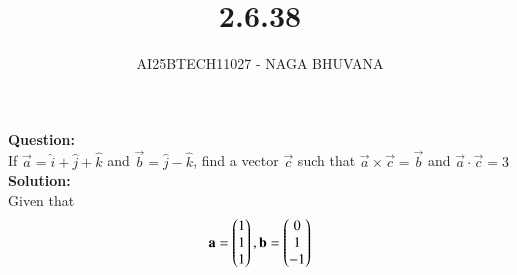 \documentclass[journal,12pt,onecolumn]{IEEEtran}
\begin{document}
\title{2.6.38}
\author{AI25BTECH11027 - NAGA BHUVANA}
{\let\newpage\relax\maketitle}
\noindent
		\textbf{Question:}\\
If $\vec{a}=\hat{i}+\hat{j}+\hat{k}$ and $\vec{b}=\hat{j}-\hat{k}$, find a vector $\vec{c}$ such that $\vec{a} \times \vec{c}=\vec{b}$ and $\vec{a} \cdot \vec{c}=3$\\
\textbf{Solution:}\\
	Given that
    \begin{align}
        \mathbf{a}=\begin{pmatrix}1\\1\\1\end{pmatrix},\mathbf{b}=\begin{pmatrix}0\\1\\-1\end{pmatrix}
    \end{align}
    
\end{document}
